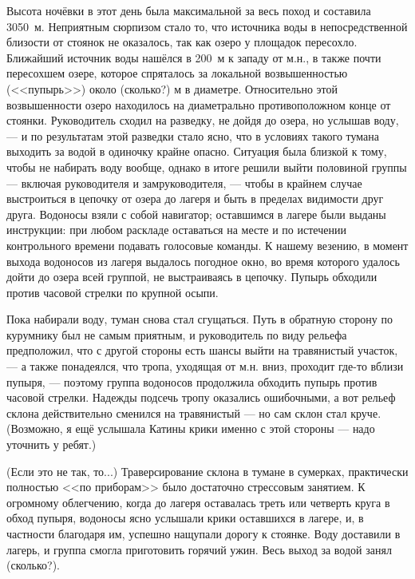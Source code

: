 Высота ночёвки в этот день была максимальной за весь поход и составила 3050~м. Неприятным сюрпизом стало то, что источника воды в непосредственной близости от стоянок не оказалось, так как озеро у площадок пересохло. Ближайший источник воды нашёлся в 200~м к западу от м.н., в также почти пересохшем озере, которое спряталось за локальной возвышенностью (<<пупырь>>) около \alert{(сколько?)} м в диаметре. Относительно этой возвышенности озеро находилось на диаметрально противоположном конце от стоянки. Руководитель сходил на разведку, не дойдя до озера, но услышав воду, --- и по результатам этой разведки стало ясно, что в условиях такого тумана выходить за водой в одиночку крайне опасно. Ситуация была близкой к тому, чтобы не набирать воду вообще, однако в итоге решили выйти половиной группы --- включая руководителя и замруководителя, --- чтобы в крайнем случае выстроиться в цепочку от озера до лагеря и быть в пределах видимости друг друга. Водоносы взяли с собой навигатор; оставшимся в лагере были выданы инструкции: при любом раскладе оставаться на месте и по истечении контрольного времени подавать голосовые команды. К нашему везению, в момент выхода водоносов из лагеря выдалось погодное окно, во время которого удалось дойти до озера всей группой, не выстраиваясь в цепочку. Пупырь обходили против часовой стрелки по крупной осыпи. 

Пока набирали воду, туман снова стал сгущаться. Путь в обратную сторону по курумнику был не самым приятным, и руководитель по виду рельефа предположил, что с другой стороны есть шансы выйти на травянистый участок, --- а также понадеялся, что тропа, уходящая от м.н. вниз, проходит где-то вблизи пупыря, --- поэтому группа водоносов продолжила обходить пупырь против часовой стрелки. Надежды подсечь тропу оказались ошибочными, а вот рельеф склона действительно сменился на травянистый --- но сам склон стал круче.\alert{(Возможно, я ещё услышала Катины крики именно с этой стороны --- надо уточнить у ребят.)} 

\alert{(Если это не так, то...)} Траверсирование склона в тумане в сумерках, практически полностью <<по приборам>> было достаточно стрессовым занятием. К огромному облегчению, когда до лагеря оставалась треть или четверть круга в обход пупыря, водоносы ясно услышали крики оставшихся в лагере, и, в частности благодаря им, успешно нащупали дорогу к стоянке. Воду доставили в лагерь, и группа смогла приготовить горячий ужин. Весь выход за водой занял \alert{(сколько?)}.



